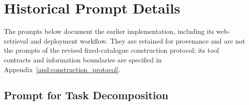 \section{Historical Prompt Details} \label{apd:prompts}

The prompts below document the earlier implementation, including its web-retrieval and deployment workflow. They are retained for provenance and are not the prompts of the revised fixed-catalogue construction protocol; its tool contracts and information boundaries are specified in Appendix~\ref{apd:construction_protocol}.

\subsection{Prompt for Task Decomposition}  \label{apd:prompt_task_decpm}

